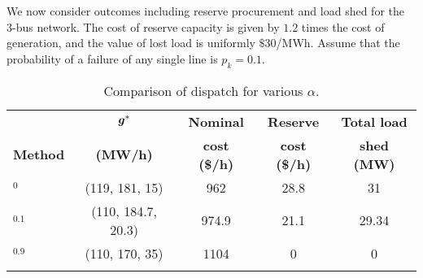 We now consider \RSCED{} outcomes including reserve procurement and load shed for the 3-bus network. The cost of reserve capacity is given by $1.2$ times the cost of generation, and the value of lost load is uniformly $\$30$/MWh. Assume that the probability of a failure of any single line is $p_k = 0.1$. 
%
%
\begin{table}[H]
    \centering
        \caption{Comparison of \RSCED{} dispatch for various $\alpha$.}\label{tab:RSCED.compare}
    \begin{tabular}{l c c c c}
         \toprule
         & ${\bm{g}}^*$ & \textbf{Nominal} & \textbf{Reserve} & \textbf{Total load} \\
         \textbf{Method} & \textbf{(MW/h)} & \textbf{cost (\$/h)} & \textbf{cost (\$/h)} & \textbf{shed (MW)}  \\
         \midrule
         \RSCED{}$_0$ & (119, 181, 15) & 962 & 28.8 & 31 \\
         \RSCED{}$_{0.1}$ & (110, 184.7, 20.3) & 974.9 & 21.1 & 29.34 \\
         \RSCED{}$_{0.9}$ & (110, 170, 35) & 1104 & 0 & 0 \\
         \bottomrule \\
    \end{tabular}
\end{table}

